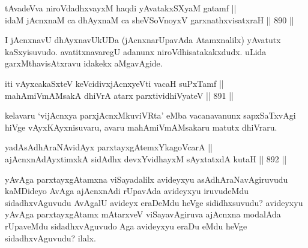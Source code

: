 
\begin{shl}
tAvadeVva niroVdadhxvayxM haqdi yAvatakxSXyaM gatamf || \\
idaM jAcnxnaM ca dhAyxnaM ca sheVSoVnoyxV garxnathxvisatxraH \hfill || 890 ||  
\end{shl}

\begin{artha}
I jAcnxnavU dhAyxnavUkUDa (jAcnxnarUpavAda Atamxnalilx) yAvatutx kaSxyisuvudo. avatitxnavaregU adanunx niroVdhisatakakxdudx. uLida garxMthavisAtxravu idakekx aMgavAgide.
\end{artha}


\begin{shl}
iti vAyxcakaSxteV keVcidivxjAcnxyeVti vacaH suPxTamf || \\
mahAmiVmAMsakA dhiVrA atarx parxtividhiVyateV \hfill || 891 ||  
\end{shl}

\begin{artha}
kelavaru `vijAcnxya parxjAcnxMkuviVRta' eMba vacanavanunx sapxSaTxvAgi hiVge vAyxKAyxnisuvaru, avaru mahAmiVmAMsakaru matutx dhiVraru.
\end{artha}


\begin{shl}
\footnotemark[1]yadA\s sAdhAraNA\s vidAyx parxtayxgAtemxYkagoVcarA || \\
ajAcnxnAdAyxtimxkA sidAdhx devxYvidhayxM sAyxtatxdA kutaH \hfill || 892 ||  
\end{shl}

\begin{artha}
yAvAga parxtayxgAtamxna viSayadalilx avideyxyu asAdhAraNavAgiruvudu kaMDideyo AvAga ajAcnxnAdi rUpavAda avideyxyu iruvudeMdu sidadhxvAguvudu AvAgalU avideyx eraDeMdu heVge sididhxsuvudu? avideyxyu yAvAga parxtayxgAtamx mAtarxveV viSayavAgiruva ajAcnxna modalAda rUpaveMdu sidadhxvAguvudo Aga avideyxyu eraDu eMdu heVge sidadhxvAguvudu? ilalx.
\end{artha}

